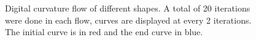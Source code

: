 \documentclass[runningheads]{llncs}
\begin{document}
\begin{figure}[!ht]
		\hspace{15pt}
		\hspace{15pt}
		\caption{Digital curvature flow of different shapes. A total of 20 iterations were done in each flow, curves are displayed at every 2 iterations. The initial curve is in red and the end curve in blue.}
		\label{fig:digital_flows}	
	\end{figure}
\end{document}

